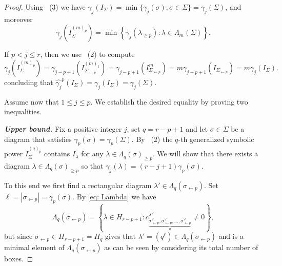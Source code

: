 \documentclass[11pt, reqno]{amsart}
\numberwithin{equation}{section}
\theoremstyle{definition}
\renewcommand{\l}{\lambda}
\newcommand{\s}{\sigma}
\begin{document}
		\begin{proof}
			Using ~(3) we have $\gamma_j(I_\Sigma)=\min\{\gamma_j(\sigma): \sigma\in \Sigma\}=\gamma_j(\Sigma)$,  and moreover
				\[\gamma_j\left(I_\Sigma^{(m)_p}\right )=\min\left \{ \gamma_j(\l_{\geq p}) : \lambda \in \Lambda_m(\Sigma) \right \}.\]

				If $p < j \leq r$, then we use ~(2) to compute
\[
\gamma_j(I_\Sigma^{(m)_p})=\gamma_{j-p+1}(I_{\Sigma_{\leftarrow p}}^{(m)_1})=\gamma_{j-p+1}(I_{\Sigma_{\leftarrow p}}^{m})=m\gamma_{j-p+1}(I_{\Sigma_{\leftarrow p}})=m\gamma_j(I_\Sigma).
\]
concluding that $\widehat{\gamma_j}^p(I_\Sigma)=\gamma_j(I_\Sigma)=\gamma_j(\Sigma)$.

Assume now that $1\leq j\leq p$. We establish the desired equality by proving two inequalities.

\medskip
\noindent
\textbf{\em Upper bound.}
Fix a positive integer $j$, set $q=r-p+1$ and let $\sigma\in\Sigma$ be a diagram that satisfies $\gamma_p(\s)= \gamma_p(\Sigma)$. By ~(2) the $q$-th generalized symbolic power $I_\Sigma^{(q)_p}$ contains $I_{\l}$ for any  $\l\in \Lambda_q(\s)_{\geq p}$. We will show that there exists a diagram $\l\in \Lambda_q(\s)_{\geq p}$ so that $\gamma_j\left(\l\right)=(r-j+1)\gamma_p(\s)$.

To this end we first find a rectangular diagram $\l'\in \Lambda_q(\s_{\leftarrow p})$. Set $\ell=|\s_{\leftarrow p}|=\gamma_p(\s)$. By \eqref{eq: Lambda} we have
\[
\Lambda_q(\s_{\leftarrow p}) =\left\{\l\in H_{r-p+1} : c^{\l^\vee}_{\underbrace{\s_{\leftarrow p}^\vee,\s_{\leftarrow p}^\vee, \ldots, \s_{\leftarrow p}^\vee}_{q}} \neq 0\right\},
\]
but since $\s_{\leftarrow p}\in H_{r-p+1}=H_q$ 
 gives that $\l'=(q^{\ell})\in \Lambda_q(\s_{\leftarrow p})$  and is a minimal element of $\Lambda_q(\s_{\leftarrow p})$ as can be seen by considering its total number of boxes.


\end{proof}
\end{document}
